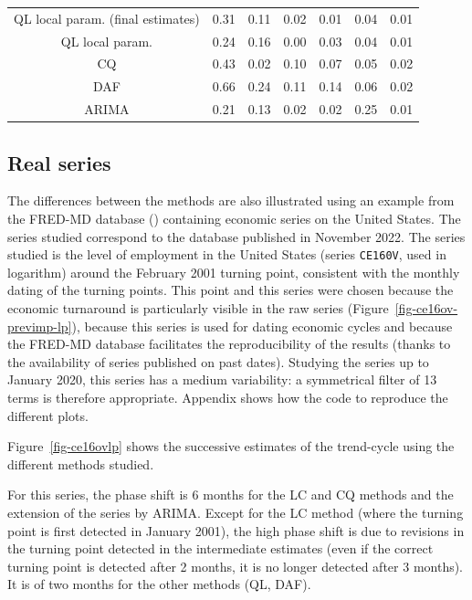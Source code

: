 \documentclass[
]{article}
\newcommand\1{\mathds{1}}
\begin{document}
\begin{table}[!h]
\begin{tabular}{ccccccc}
\hspace{1em}QL local param. (final estimates) & 0.31 & 0.11 & 0.02 & 0.01 & 0.04 & 0.01\\
\hspace{1em}QL local param. & 0.24 & 0.16 & 0.00 & 0.03 & 0.04 & 0.01\\
\hspace{1em}CQ & 0.43 & 0.02 & 0.10 & 0.07 & 0.05 & 0.02\\
\hspace{1em}DAF & 0.66 & 0.24 & 0.11 & 0.14 & 0.06 & 0.02\\
\hspace{1em}ARIMA & 0.21 & 0.13 & 0.02 & 0.02 & 0.25 & 0.01\\
\bottomrule
\end{tabular}
\end{table}

\hypertarget{real-series}{%
\subsection{Real series}\label{real-series}}

The differences between the methods are also illustrated using an
example from the FRED-MD database (\textcite{fredmd}) containing
economic series on the United States. The series studied correspond to
the database published in November 2022. The series studied is the level
of employment in the United States (series \texttt{CE160V}, used in
logarithm) around the February 2001 turning point, consistent with the
monthly dating of the turning points. This point and this series were
chosen because the economic turnaround is particularly visible in the
raw series (Figure~\ref{fig-ce16ov-previmp-lp}), because this series is
used for dating economic cycles and because the FRED-MD database
facilitates the reproducibility of the results (thanks to the
availability of series published on past dates). Studying the series up
to January 2020, this series has a medium variability: a symmetrical
filter of 13 terms is therefore appropriate. Appendix
\autocite*{ann-ex-r} shows how the code to reproduce the different
plots.

Figure~\ref{fig-ce16ovlp} shows the successive estimates of the
trend-cycle using the different methods studied.

For this series, the phase shift is 6 months for the LC and CQ methods
and the extension of the series by ARIMA. Except for the LC method
(where the turning point is first detected in January 2001), the high
phase shift is due to revisions in the turning point detected in the
intermediate estimates (even if the correct turning point is detected
after 2 months, it is no longer detected after 3 months). It is of two
months for the other methods (QL, DAF).
\end{document}
